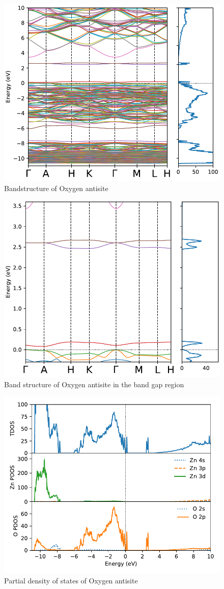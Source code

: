\begin{figure}[tbh!]
	\centering
	\includegraphics[width=0.6\linewidth]{"images/rnd/band-dos_O_anti"}
	\caption[Bandstructure of Oxygen antisite]{Bandstructure of Oxygen antisite}
	\label{fig:band-dos_O_anti}
\end{figure}

\begin{figure}[tbh!]
	\centering
	\includegraphics[width=0.6\linewidth]{"images/rnd/band-dos-close_O_anti"}
	\caption[Band structure of Oxygen antisite in the band gap region]{Band structure of Oxygen antisite  in the band gap region}
	\label{fig:band-dos-close_O_anti}
\end{figure}

\clearpage

\begin{figure}[t!]
	\centering
	\includegraphics[width=0.6\linewidth]{"images/rnd/dos-pdos_O_anti"}
	\caption[Partial density of states of Oxygen antisite]{Partial density of states of Oxygen antisite}
	\label{fig:dos-pdos_O_anti}
\end{figure}

